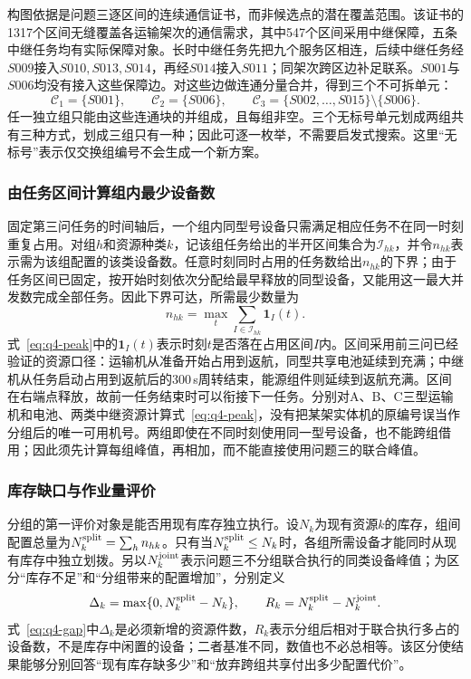 \documentclass[bwprint,fontset=fandol]{gmcmthesis}
\begin{document}
构图依据是问题三逐区间的连续通信证书，而非候选点的潜在覆盖范围。该证书的1317个区间无缝覆盖各运输架次的通信需求，其中547个区间采用中继保障，五条中继任务均有实际保障对象。长时中继任务先把九个服务区相连，后续中继任务经$S009$接入$S010,S013,S014$，再经$S014$接入$S011$；同架次跨区边补足联系。$S001$与$S006$均没有接入这些保障边。对这些边做连通分量合并，得到三个不可拆单元：
\begin{equation}
\mathcal C_1=\{S001\},\qquad
\mathcal C_2=\{S006\},\qquad
\mathcal C_3=\{S002,\ldots,S015\}\setminus\{S006\}.
\label{eq:q4-components}
\end{equation}
任一独立组只能由这些连通块的并组成，且每组非空。三个无标号单元划成两组共有三种方式，划成三组只有一种；因此可逐一枚举，不需要启发式搜索。这里“无标号”表示仅交换组编号不会生成一个新方案。

\subsubsection{由任务区间计算组内最少设备数}
固定第三问任务的时间轴后，一个组内同型号设备只需满足相应任务不在同一时刻重复占用。对组$h$和资源种类$k$，记该组任务给出的半开区间集合为$\mathcal I_{hk}$，并令$n_{hk}$表示需为该组配置的该类设备数。任意时刻同时占用的任务数给出$n_{hk}$的下界；由于任务区间已固定，按开始时刻依次分配给最早释放的同型设备，又能用这一最大并发数完成全部任务。因此下界可达，所需最少数量为
\begin{equation}
n_{hk}=\max_t\sum_{I\in\mathcal I_{hk}}\mathbf 1_I(t).
\label{eq:q4-peak}
\end{equation}
式~\eqref{eq:q4-peak}中的$\mathbf 1_I(t)$表示时刻$t$是否落在占用区间$I$内。区间采用前三问已经验证的资源口径：运输机从准备开始占用到返航，同型共享电池延续到充满；中继机从任务启动占用到返航后的300\,s周转结束，能源组件则延续到返航充满。区间在右端点释放，故前一任务结束时可以衔接下一任务。分别对A、B、C三型运输机和电池、两类中继资源计算式~\eqref{eq:q4-peak}，没有把某架实体机的原编号误当作分组后的唯一可用机号。两组即使在不同时刻使用同一型号设备，也不能跨组借用；因此须先计算每组峰值，再相加，而不能直接使用问题三的联合峰值。

\subsubsection{库存缺口与作业量评价}
分组的第一评价对象是能否用现有库存独立执行。设$N_k$为现有资源$k$的库存，组间配置总量为$N_k^{\rm split}=\sum_h n_{hk}$。只有当$N_k^{\rm split}\le N_k$时，各组所需设备才能同时从现有库存中独立划拨。另以$N_k^{\rm joint}$表示问题三不分组联合执行的同类设备峰值；为区分“库存不足”和“分组带来的配置增加”，分别定义
\begin{equation}
\Delta_k=\max\{0,N_k^{\rm split}-N_k\},\qquad
R_k=N_k^{\rm split}-N_k^{\rm joint}.
\label{eq:q4-gap}
\end{equation}
式~\eqref{eq:q4-gap}中$\Delta_k$是必须新增的资源件数，$R_k$表示分组后相对于联合执行多占的设备数，不是库存中闲置的设备；二者基准不同，数值也不必总相等。该区分使结果能够分别回答“现有库存缺多少”和“放弃跨组共享付出多少配置代价”。
\end{document}
